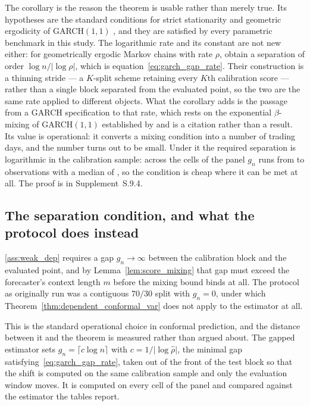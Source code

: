 The corollary is the reason the theorem is usable rather than merely true. Its
hypotheses are the standard conditions for strict stationarity and geometric
ergodicity of GARCH$(1,1)$ \citep[Theorem~2.10]{francq2019garch,lindner2009stationarity},
and they are satisfied by every parametric benchmark in this study. The
logarithmic rate and its constant are not new either: for geometrically ergodic
Markov chains with rate $\rho$, \citet[Theorem~5.1]{zheng2024conformal} obtain
a separation of order $\log n/\lvert\log\rho\rvert$, which is
equation~\eqref{eq:garch_gap_rate}. Their construction is a thinning stride --- a
$K$-split scheme retaining every $K$th calibration score --- rather than a single
block separated from the evaluated point, so the two are the same rate applied to
different objects. What the corollary adds is the passage from a GARCH
specification to that rate, which rests on the exponential $\beta$-mixing of
GARCH$(1,1)$ established by \citet{carrasco2002mixing} and is a citation rather
than a result. Its value is operational: it converts a mixing condition into a
number of trading days, and the number turns out to be small. Under it the
required separation is logarithmic in the calibration sample: across the
\nGapPanelCells{} cells of the panel $g_n$ runs from \nGapPanelGapLo{} to
\nGapPanelGapHi{} observations with a median of \nGapPanelGapMed, so the
condition is cheap where it can be met at all. The proof
is in Supplement~S.9.4.

\subsection{The separation condition, and what the protocol does instead}
\label{sec:theory_gap}

\ref{ass:weak_dep} requires a gap $g_n\to\infty$ between the calibration block
and the evaluated point, and by Lemma~\ref{lem:score_mixing} that gap must exceed
the forecaster's context length $m$ before the mixing bound binds at all. The
protocol as originally run was a contiguous $70/30$ split with $g_n = 0$, under
which Theorem~\ref{thm:dependent_conformal_var} does not apply to the estimator
at all.

This is the standard operational choice in conformal prediction, and the
distance between it and the theorem is measured rather than argued about. The
gapped estimator sets $g_n = \lceil c\log n\rceil$ with
$c = 1/\lvert\log\hat\rho\rvert$, the minimal gap
satisfying~\eqref{eq:garch_gap_rate}, taken out of the front of the test block so
that the shift is computed on the same calibration sample and only the evaluation
window moves. It is computed on every cell of the panel and compared against the
estimator the tables report.

